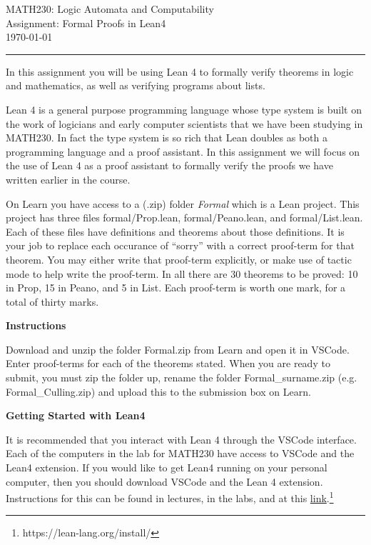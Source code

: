 \documentclass[12pt,letterpaper, onecolumn]{exam}
\begin{document}
\begingroup  
    \centering
    \LARGE MATH230: Logic Automata and Computability\\
    \LARGE Assignment: Formal Proofs in Lean4\\[0.5em]
    \large \today\\[0.5em]
\endgroup
\rule{\textwidth}{0.4pt}
\pointsdroppedatright   %
\printanswers
\renewcommand{\solutiontitle}{\noindent\textbf{Ans:}\enspace}   %



In this assignment you will be using Lean 4 to formally verify theorems in logic and mathematics, as well as verifying programs about lists. 

Lean 4 is a general purpose programming language whose type system is built on the work of logicians and early computer scientists that we have been studying in MATH230. In fact the type system is so rich that Lean doubles as both a programming language and a proof assistant. In this assignment we will focus on the use of Lean 4 as a proof assistant to formally verify the proofs we have written earlier in the course. 

On Learn you have access to a (.zip) folder \emph{Formal} which is a Lean project. This project has three files formal/Prop.lean, formal/Peano.lean, and formal/List.lean. Each of these files have definitions and theorems about those definitions. It is your job to replace each occurance of ``sorry'' with a correct proof-term for that theorem. You may either write that proof-term explicitly, or make use of tactic mode to help write the proof-term. In all there are 30 theorems to be proved: 10 in Prop, 15 in Peano, and 5 in List. Each proof-term is worth one mark, for a total of thirty marks.

\vspace{2mm}
\textbf{Instructions}

Download and unzip the folder Formal.zip from Learn and open it in VSCode. Enter proof-terms for each of the theorems stated. When you are ready to submit, you must zip the folder up, rename the folder Formal\_surname.zip (e.g. Formal\_Culling.zip) and upload this to the submission box on Learn.

\vspace{2mm}
\textbf{Getting Started with Lean4}

It is recommended that you interact with Lean 4 through the VSCode interface. Each of the computers in the lab for MATH230 have access to VSCode and the Lean4 extension. If you would like to get Lean4 running on your personal computer, then you should download VSCode and the Lean 4 extension. Instructions for this can be found in lectures, in the labs, and at this \href{https://lean-lang.org/install/}{link}.\footnote{https://lean-lang.org/install/}
\end{document}
